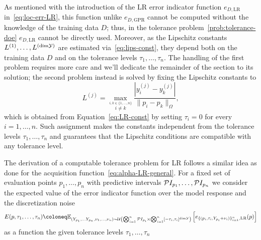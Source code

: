 As mentioned with the introduction of the LR error indicator function $e_{D, \text{LR}}$ in~\eqref{eq:loc-err-LR}, this function unlike $e_{D, \text{GPR}}$ cannot be computed without the knowledge of the training data $D$; thus, in the tolerance problem~\eqref{prob:tolerance-doe} $e_{D, \text{LR}}$ cannot be directly used. 
Moreover, as the Lipschitz constants $L^{(1)}, \dots, L^{(\text{dim} \mathcal Y)}$ are estimated via~\eqref{eq:lips-const}, they depend both on the training data $D$ and on the tolerance levels $\tau_1, \dots, \tau_n$. \newline
The handling of the first problem requires more care and we'll dedicate the remainder of the section to its solution; the second problem instead is solved by fixing the Lipschitz constants to \[
    L^{(j)} = \max_{ \stackrel{i, k \in \{1, \dots, n\}}{i\neq k} } \frac{| y_i^{(j)} - y_k^{(j)} |}{\| p_i - p_k \|_\Omega},
\]
which is obtained from Equation~\eqref{eq:LR-const} by setting $\tau_i=0$ for every $i=1,\dots,n$.
Such assignment makes the constants independent from the tolerance levels $\tau_1, \dots, \tau_n$ and guarantees that the Lipschitz conditions are compatible with any tolerance level.\medskip

The derivation of a computable tolerance problem for LR follows a similar idea as done for the acquisition function~\eqref{eq:alpha-LR-general}.
For a fixed set of evaluation points $p_1, \dots, p_n$ with predictive intervals $\mathcal PI_{p_1}, \dots, \mathcal PI_{p_n}$ we consider the expected value of the error indicator function over the model response and the discretization noise
\begin{equation} \label{eq:tol-exp-err}
    E(p, \tau_1, \dots, \tau_n)\coloneq \bb E _{ (Y_{p_1}, \dots Y_{p_n}, \nu_1, \dots, \nu_n) \sim  \mc U\left( \bigotimes_{i=1}^n \mc PI_{p_i} \times \bigotimes_{i=1}^n  [-\tau_i, \tau_i] ^{ \text{dim} \mc Y } \right)} 
    \left[ 
         e_{\{(p_i,\tau_i, Y_{p_i} + \nu_i )\}_{i=1}^n, \text{LR}}(p)
    \right]
\end{equation}
as a function the given tolerance levels $\tau_1, \dots, \tau_n$

